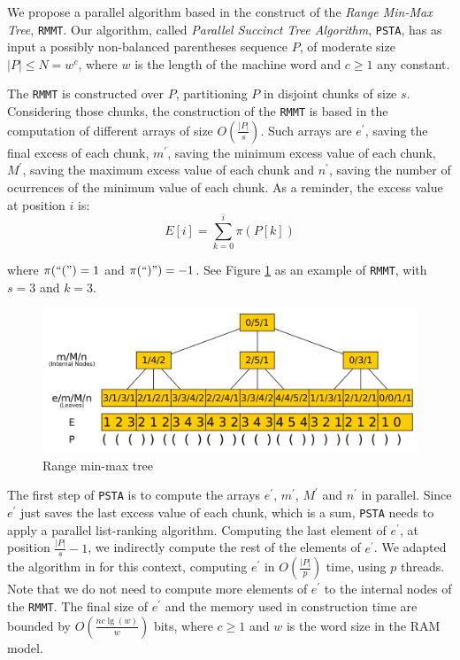 We propose a parallel algorithm based in the construct of the \emph{Range Min-Max Tree}, {\tt RMMT}\cite{Navarro:2014:FFS:2620785.2601073}. Our algorithm, called \emph{Parallel Succinct Tree Algorithm}, {\tt PSTA}, has as input a possibly non-balanced parentheses sequence $P$, of moderate size $|P|\leq N = w^{c}$, where $w$ is the length of the machine word and $c\geq 1$ any constant.

The {\tt RMMT} is constructed over $P$, partitioning $P$ in disjoint chunks of size $s$. Considering those chunks, the construction of the {\tt RMMT} is based in the computation of different arrays of size $O(\frac{|P|}{s})$. Such arrays are $e^{\prime}$, saving the final excess of each chunk, $m^{\prime}$, saving the minimum excess value of each chunk, $M^{\prime}$, saving the maximum excess value of each chunk and $n^{\prime}$, saving the number of ocurrences of the minimum value of each chunk. As a reminder, the excess value at position $i$ is:
\begin{equation}
		\displaystyle E[i] = \sum_{k=0}^{i} \pi(P[k])
		\label{eq:excess}
\end{equation}

where $\pi(``(") = 1$ and $\pi(``)") = -1$. See Figure \ref{fig:RangeMinMaxTree} as an example of {\tt RMMT}, with $s=3$ and $k=3$.

 	\begin{figure}[ht]
		\centering
		\includegraphics[scale=0.18]{./images/Range-min-max-tree.png}
     	\caption{Range min-max tree}
		\label{fig:RangeMinMaxTree} 
	\end{figure}

The first step of {\tt PSTA} is to compute the arrays $e^{\prime}$, $m^{\prime}$, $M^{\prime}$ and $n^{\prime}$ in parallel. Since $e^{\prime}$ just saves the last excess value of each chunk, which is a sum, {\tt PSTA} needs to apply a parallel list-ranking algorithm. Computing the last element of $e^{\prime}$, at position $\frac{|P|}{s}-1$, we indirectly compute the rest of the elements of $e^{\prime}$. We adapted the algorithm in \cite{Helman2001265} for this context, computing $e^{\prime}$ in $O(\frac{|P|}{p})$ time, using $p$ threads. Note that we do not need to compute more elements of $e^{\prime}$ to the internal nodes of the {\tt RMMT}. The final size of $e^{\prime}$  and the memory used in construction time are bounded by $O(\frac{nc\lg(w)}{w})$ bits, where $c\geqslant 1$ and $w$ is the word size in the RAM model.

